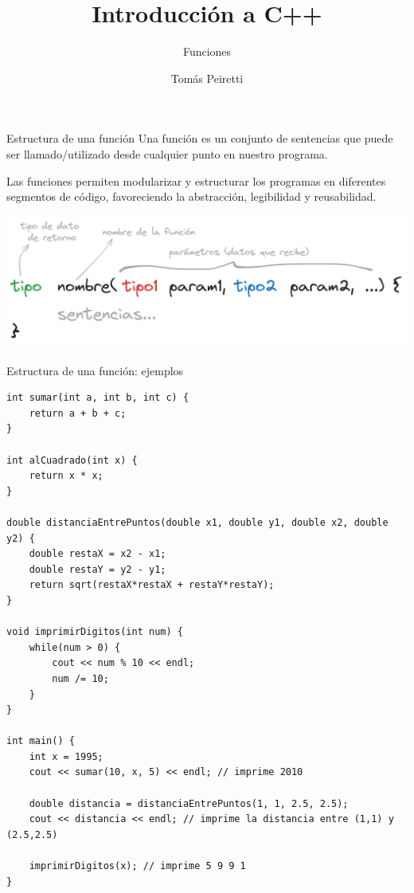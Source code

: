 \documentclass[12pt]{beamer}
\title{Introducción a C++}
\subtitle{Funciones}
\author{Tomás Peiretti}
\date{}
\begin{document}
\maketitle

\begin{frame}{Estructura de una función}
    Una función es un conjunto de sentencias que puede ser llamado/utilizado desde cualquier punto en nuestro programa.

    \medskip

    Las funciones permiten modularizar y estructurar los programas en diferentes segmentos de código, favoreciendo la abstracción, legibilidad y reusabilidad.

    \medskip

    \includegraphics[width=\textwidth]{funcion.png}

\end{frame}

\begin{frame}[fragile]{Estructura de una función: ejemplos}
\begin{lstlisting}[basicstyle=\tiny]
int sumar(int a, int b, int c) {
    return a + b + c;
}

int alCuadrado(int x) {
    return x * x;
}

double distanciaEntrePuntos(double x1, double y1, double x2, double y2) {
    double restaX = x2 - x1;
    double restaY = y2 - y1;
    return sqrt(restaX*restaX + restaY*restaY);
}

void imprimirDigitos(int num) {
    while(num > 0) {
        cout << num % 10 << endl;
        num /= 10;
    }
}

int main() {
    int x = 1995;
    cout << sumar(10, x, 5) << endl; // imprime 2010

    double distancia = distanciaEntrePuntos(1, 1, 2.5, 2.5);
    cout << distancia << endl; // imprime la distancia entre (1,1) y (2.5,2.5)

    imprimirDigitos(x); // imprime 5 9 9 1
}
\end{lstlisting}
\end{frame}
\end{document}
